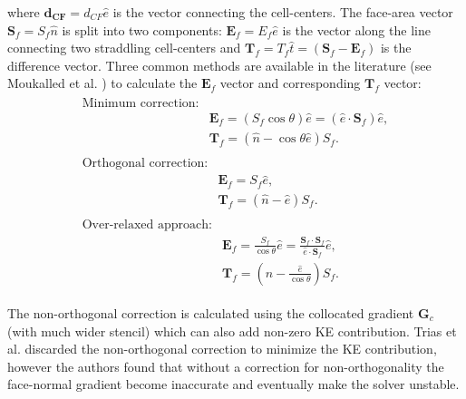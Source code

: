 \begin{itemize}
where $\mathbf{d_{CF}} = d_{CF}{\hat{e}}$ is the vector connecting the cell-centers. The face-area vector $\mathbf{S}_f = S_f \hat{n}$ is split into two components: $\mathbf{E}_f = E_f \hat{e}$ is the vector along the line connecting two straddling cell-centers and $\mathbf{T}_f = T_f \hat{t}= (\mathbf{S}_f - \mathbf{E}_f)$ is the difference vector. Three common methods are available in the literature (see Moukalled et al. \cite[chapter 8.6]{moukalled2015}) to calculate the $\mathbf{E}_f$ vector and corresponding $\mathbf{T}_f$ vector:
\begin{subequations}
\begin{align}
\begin{split}
\text{Minimum correction:}&
\\
& \mathbf{E}_f = (S_f \cos\theta) \hat{e} = ( \hat{e} \cdot \mathbf{S}_f )\hat{e},
\\
& \mathbf{T}_f = (\hat{n} - \cos \theta \hat{e}) S_f.
\label{eqn:nonOrth-minCorr}
\end{split} 
\\
\begin{split}
\text{Orthogonal correction:} &
\\ 
& \mathbf{E}_f = S_f \hat{e},
\\
& \mathbf{T}_f = (\hat{n} - \hat{e}) S_f.
\label{eqn:nonOrth-orthCorr}
\end{split}
\\
\begin{split}
\text{Over-relaxed approach:} & 
\\
& \mathbf{E}_f = \frac{ S_f}{\cos\theta} \hat{e} = \frac{\mathbf{S}_f \cdot \mathbf{S}_f}{\hat{e} \cdot \mathbf{S}_f} \hat{e} ,
\\
& \mathbf{T}_f = (\hat{n} - \frac{\hat{e}}{\cos \theta} ) S_f.
\label{eqn:nonOrth-overRelaxCorr}
\end{split}
\end{align}
\label{eqn:nonOrthTypes}
\end{subequations}

The non-orthogonal correction is calculated using the collocated gradient ${\mathbf{G}_c}$ (with much wider stencil) which can also add non-zero KE contribution. Trias et al. \cite{trias2014} discarded the non-orthogonal correction to minimize the KE contribution, however the authors found that without a correction for non-orthogonality the face-normal gradient become inaccurate and eventually make the solver unstable.
\end{itemize}



